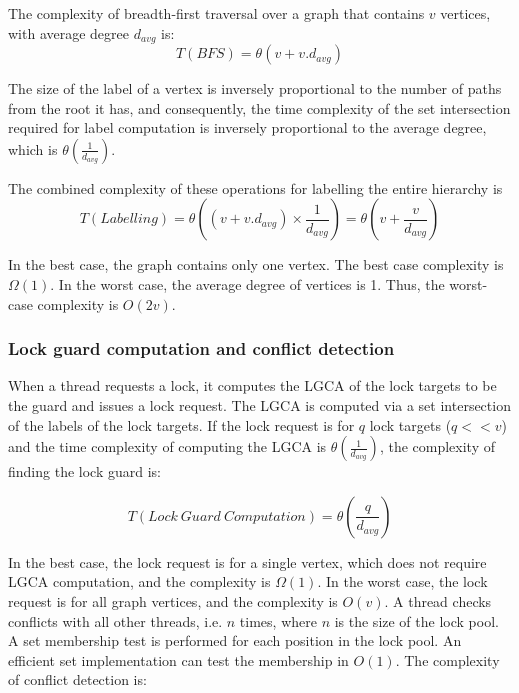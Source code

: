 The complexity of breadth-first traversal over a graph that contains $v$ vertices, with average degree $d_{avg}$ is:
\begin{equation*}
	T(\mathit{BFS}) =\theta(v + v.d_{avg}) 
\end{equation*}

The size of the label of a vertex is inversely proportional to the number of paths from the root it has, and consequently, the time complexity of the set intersection required for label computation is inversely proportional to the average degree, which is $\theta(\frac{1}{d_{avg}})$. 


The combined complexity of these operations for labelling the entire hierarchy is 
\begin{equation*}
T(Labelling) = 	\theta((v + v.d_{avg}) \times {\frac{1}{d_{avg}}}) = \theta(v+ \frac{v}{d_{avg}})
\end{equation*}


In the best case, the graph contains only one vertex. The best case complexity is $\Omega(1)$.
In the worst case, the average degree of vertices is 1. Thus, the worst-case complexity is $O(2v)$.


\subsubsection{Lock guard computation and conflict detection}

When a thread requests a lock, it computes the LGCA of the lock targets to be the guard and issues a lock request. 
The LGCA is computed via a set intersection of the labels of the lock targets. 
If the lock request is for $q$ lock targets ($q << v$) and the time complexity of computing the LGCA is $\theta(\frac{1}{d_{avg}})$, the complexity of finding the lock guard is:

\begin{equation*}
	T(Lock~Guard~Computation) = \theta(\frac{q}{d_{avg}})
\end{equation*}



In the best case, the lock request is for a single vertex, which does not require LGCA computation, and the complexity is $\Omega(1)$. In the worst case, the lock request is for all graph vertices, and the complexity is $O(v)$. A thread checks conflicts with all other threads, i.e. $n$ times, where $n$ is the size of the lock pool. A set membership test is performed for each position in the lock pool. An efficient set implementation can test the membership in $O(1)$. The complexity of conflict detection is:
 
